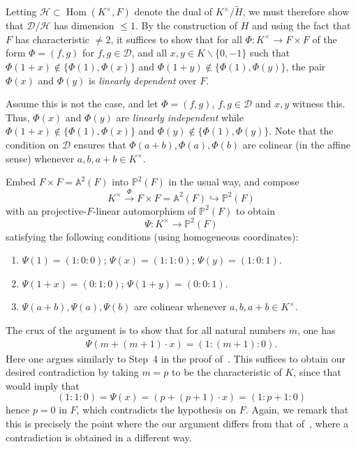 \documentclass[12pt]{amsart}
\newcommand{\Hom}{\operatorname{Hom}}
\newcommand{\Dcal}{\mathcal{D}}
\newcommand{\smin}{\smallsetminus}
\newcommand{\Pbb}{\mathbb{P}}
\newcommand{\Abb}{\mathbb{A}}
\newcommand{\Hcal}{\mathcal{H}}
\renewcommand{\tilde}{\widetilde}
\begin{document}
Letting $\Hcal \subset \Hom(K^{\times},F)$ denote the dual of $K^{\times}/\tilde H$, we must therefore show that $\Dcal/\Hcal$ has dimension $\le 1$.
By the construction of $H$ and using the fact that $F$ has characteristic $\neq 2$, it suffices to show that for all $\Phi : K^{\times} \to F \times F$ of the form $\Phi = (f,g)$ for $f,g \in \Dcal$, and all $x,y \in K \smin \{0,-1\}$ such that $\Phi(1+x) \notin \{\Phi(1),\Phi(x)\}$ and $\Phi(1+y) \notin \{\Phi(1),\Phi(y)\}$, the pair $\Phi(x)$ and $\Phi(y)$ is \emph{linearly dependent} over $F$.

Assume this is not the case, and let $\Phi = (f,g)$, $f,g \in \Dcal$ and $x,y$ witness this.
Thus, $\Phi(x)$ and $\Phi(y)$ are \emph{linearly independent} while $\Phi(1+x) \notin \{\Phi(1),\Phi(x)\}$ and $\Phi(y) \notin \{\Phi(1),\Phi(y)\}$.
Note that the condition on $\Dcal$ ensures that $\Phi(a+b),\Phi(a),\Phi(b)$ are colinear (in the affine sense) whenever $a,b,a+b \in K^{\times}$.

Embed $F \times F = \Abb^{2}(F)$ into $\Pbb^{2}(F)$ in the usual way, and compose
\[ K^{\times} \xrightarrow{\Phi} F\times F = \Abb^{2}(F) \hookrightarrow \Pbb^{2}(F) \]
with an projective-$F$-linear automorphism of $\Pbb^{2}(F)$ to obtain
\[ \Psi : K^{\times} \to \Pbb^{2}(F) \]
satisfying the following conditions (using homogeneous coordinates):
\begin{enumerate}
  \item $\Psi(1) = (1:0:0)$; $\Psi(x) = (1:1:0)$; $\Psi(y) = (1:0:1)$.
  \item $\Psi(1+x) = (0:1:0)$; $\Psi(1+y) = (0:0:1)$.
  \item $\Psi(a+b),\Psi(a),\Psi(b)$ are colinear whenever $a,b,a+b \in K^{\times}$.
\end{enumerate}
The crux of the argument is to show that for all natural numbers $m$, one has
\begin{align}\label{keyeqn}
\Psi(m + (m+1) \cdot x) = (1:(m+1):0).
\end{align}
Here one argues similarly to Step~4 in the proof of~\cite[Theorem A.3]{https://doi.org/10.48550/arxiv.1705.01084}.
This suffices to obtain our desired contradiction by taking $m = p$ to be the characteristic of $K$, since that would imply that
\[ (1:1:0) = \Psi(x) = (p + (p+1) \cdot x) = (1:p+1:0) \]
hence $p = 0$ in $F$, which contradicts the hypothesis on $F$.
Again, we remark that this is precisely the point where the our argument differs from that of~\cite[Theorem A.3]{https://doi.org/10.48550/arxiv.1705.01084}, where a contradiction is obtained in a different way.
\end{document}
